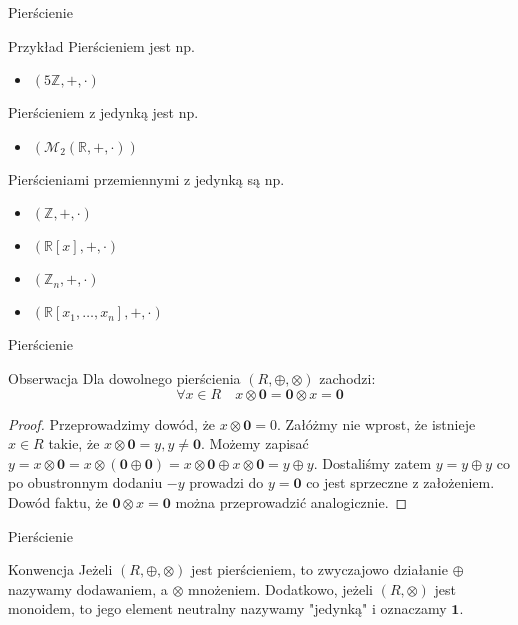 \documentclass{beamer}
\begin{document}
\begin{frame}{Pierścienie}
    \begin{exampleblock}{Przykład}
        Pierścieniem jest np.
        \begin{itemize}
            \item $(5\mathbb{Z}, +, \cdot)$
        \end{itemize}
        Pierścieniem z jedynką jest np.
        \begin{itemize}
            \item $(\mathcal{M}_2(\mathbb{R}, +, \cdot))$
        \end{itemize}
        Pierścieniami przemiennymi z jedynką są np.
        \begin{itemize}
            \item $(\mathbb{Z}, +, \cdot )$
            \item $(\mathbb{R}[x], +, \cdot )$
            \item $(\mathbb{Z}_n, +, \cdot )$
            \item $(\mathbb{R}[x_1,\ldots, x_n], +, \cdot )$
        \end{itemize}
    \end{exampleblock}
\end{frame}

\begin{frame}{Pierścienie}
    \begin{block}{Obserwacja}
        Dla dowolnego pierścienia $(R, \oplus, \otimes)$ zachodzi:
        $$ \forall x \in R \quad x \otimes \mathbf{0} =  \mathbf{0} \otimes x = \mathbf{0}$$
    \end{block}
    \pause 
    \begin{proof}
        Przeprowadzimy dowód, że $x \otimes \mathbf{0} = 0$.
        Załóżmy nie wprost, że istnieje $x \in R$ takie, że $x \otimes \mathbf{0} = y, y\neq \mathbf{0}$.
        Możemy zapisać $y = x \otimes \mathbf{0} = x \otimes (\mathbf{0} \oplus \mathbf{0}) = x \otimes \mathbf{0} \oplus x \otimes \mathbf{0} = y \oplus y$.
        Dostaliśmy zatem $y = y \oplus y$ co po obustronnym dodaniu $-y$ prowadzi do $y = \mathbf{0}$ co jest sprzeczne z założeniem.
        Dowód faktu, że $\mathbf{0} \otimes x = \mathbf{0}$ można przeprowadzić analogicznie.
    \end{proof}
\end{frame}

\begin{frame}{Pierścienie}
    \begin{alertblock}{Konwencja}
        Jeżeli $(R, \oplus, \otimes)$ jest pierścieniem, to zwyczajowo działanie $\oplus$ nazywamy dodawaniem, a $\otimes$ mnożeniem.
        Dodatkowo, jeżeli $(R, \otimes)$ jest monoidem, to jego element neutralny nazywamy "jedynką" i oznaczamy $\mathbf{1}$. 
    \end{alertblock}
\end{frame}
\end{document}

